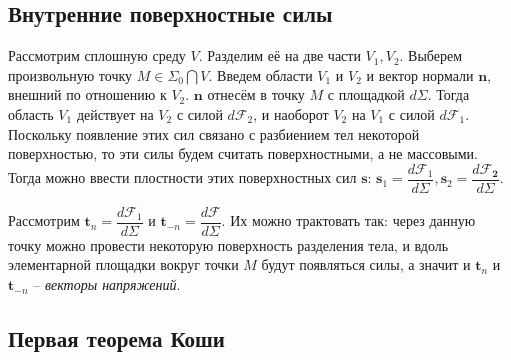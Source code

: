 \subsection{Внутренние поверхностные силы}

Рассмотрим сплошную среду $V$. Разделим её на две части $V_1, V_2$. Выберем
произвольную точку $M \in \Sigma_0 \bigcap V$. Введем области $V_1$ и $V_2$
и вектор нормали $\mathbf{n}$, внешний по отношению к $V_2$. $\mathbf{n}$
отнесём в точку $M$ с площадкой $d\Sigma$.
Тогда область $V_1$ действует на $V_2$ с силой $d\mathbf{\mathcal{F}}_2$, и
наоборот $V_2$ на $V_1$ с силой $d\mathbf{\mathcal{F}}_1$. Поскольку появление
этих сил связано с разбиением тел некоторой поверхностью, то эти силы будем
считать поверхностными, а не массовыми. Тогда можно ввести плостности этих
поверхностных сил $\mathbf{s}$: $\mathbf{s}_1 = \dfrac{d\mathbf{\mathcal{F}}_1}{d\Sigma}, \mathbf{s}_2 = \dfrac{d\mathbf{\mathcal{F}_2}}{d\Sigma}$.

Рассмотрим $\mathbf{t}_n = \dfrac{d\mathbf{\mathcal{F}}_1}{d\Sigma}$ и
$\mathbf{t}_{-n} = \dfrac{d\mathbf{\mathcal{F}}}{d\Sigma}$.
Их можно трактовать так: через данную точку можно провести некоторую поверхность
разделения тела, и вдоль элементарной площадки вокруг точки $M$ будут появляться
силы, а значит и $\mathbf{t}_n$ и $\mathbf{t}_{-n}$ -- \emph{векторы напряжений}.


\subsection{Первая теорема Коши}

